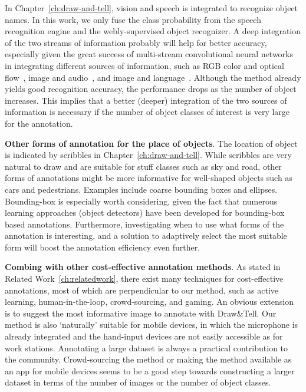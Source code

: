  
 
In Chapter~\ref{ch:draw-and-tell}, vision and speech is integrated to recognize object names. In this work, we only fuse the class probability from the speech recognition engine and the webly-supervised object recognizer. A deep integration of the two streams of information probably will help for better accuracy, especially given the great success of multi-stream convolutional neural networks in integrating different sources of information, such as RGB color and optical flow~\citep{two:stream:cnn}, image and audio~\citep{Noda2014}, and image and language~\citep{show:tell:caption}.  Although the method already yields good recognition accuracy, the performance drops as the number of object increases. This implies that a better (deeper) integration of the two sources of information is necessary if the number of object classes of interest is very large for the annotation.  


\textbf{Other forms of annotation for the place of objects}. The location of object is indicated by scribbles in Chapter~\ref{ch:draw-and-tell}. While scribbles are very natural to draw and  are suitable for stuff classes such as sky and road, other forms of annotations might be more informative for well-shaped objects such as cars and pedestrians. Examples include coarse bounding boxes and ellipses. Bounding-box is especially worth considering, given the fact that numerous learning approaches (\eg object detectors) have been developed for bounding-box based annotations.  Furthermore, investigating when to use what forms of the annotation is interesting, and a solution to adaptively select the most suitable form will boost the annotation efficiency even further.  


\textbf{Combing with other cost-effective annotation methods}. As stated in Related Work~\ref{ch:relatedwork}, there exist many techniques for cost-effective annotations, most of which are perpendicular to our method, such as active learning, human-in-the-loop, crowd-sourcing, and gaming.  An obvious extension is to suggest the most informative image to annotate with Draw\&Tell.
Our method is also `naturally'  suitable for mobile devices, in which the microphone is already integrated and the hand-input devices are not easily accessible as for work stations.  Annotating a large dataset is always a practical contribution to the community. 
Crowd-sourcing the method or making the method available as an app for mobile devices seems to be a good step towards constructing a larger dataset in terms of the number of images or the number of object classes.


